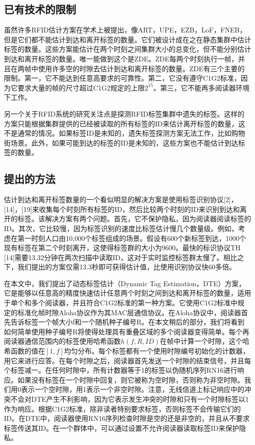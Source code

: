 \documentclass[UTF8]{ctexart}
\begin{document}
\subsection{已有技术的限制}
虽然许多RFID估计方案在学术上被提出，像ART，UPE，EZB，LoF，FNEB，但是它们都不能估计到达和离开标签的数量。它们被设计成在之在静态集群中估计标签的数量。这些方案能估计在两个时刻之间集群大小的总变化，但不能分别估计到达和离开标签的数量。唯一能做到这个是ZDE。ZDE每两个时刻执行一帧，并且在两帧中使用许多空的时隙去估计到达和离开标签的数量。ZDE有三个主要的限制。第一，它不能达到任意高要求的可靠性。第二，它没有遵守C1G2标准，因为它要求大量的帧的尺寸超过C1G2规定的上限$2^{15}$。第三，它不能再多阅读器环境下工作。

另一个关于RFID系统的研究关注点是探测RFID标签集群中遗失的标签。这样的方案只能根据集群提供的已经被读取的所有标签的ID来估计离开标签的数量，这不是通常的情况。如果标签ID是未知的，遗失标签探测方案无法工作，比如购物街场景。此外，如果可能到达的标签的ID是未知的，这些方案也不能估计到达标签的数量。

\subsection{提出的方法}
估计到达和离开标签数量的一个看似明显的解决方案是使用标签识别协议[2]，[14]，[19]来收集每个时刻所有标签的ID，然后比较两个时刻的ID来识别到达和离开的标签。该解决方案有两个问题。首先，它不保护隐私，因为阅读器阅读标签的ID。其次，它比较慢，因为标签识别的速度比标签估计慢几个数量级。例如，考虑在第一时刻人口由10,000个标签组成的场景。假设有600个新标签到达，1000个现有标签在第二个时刻离开，这使得标签群的大小为9600。最快的标识协议TH [14]需要13.32分钟在两次扫描中读取ID，这对于实时监控标签群太慢了。相比之下，我们提出的方案仅需13.3秒即可获得估计值，比使用识别协议快60多倍。

在本文中，我们提出了动态标签估计（Dynamic Tag Estimation，DTE）方案，它是能够以任意高的精度快速估计任意两个时刻之间到达和离开标签的数量，适用于单个和多个阅读器，并且符合C1G2标准的第一种方案。它使用C1G2标准中规定的标准化帧时隙Aloha协议作为其MAC层通信协议。在Aloha协议中，阅读器首先告诉标签一个帧大小f和一个随机种子编号R。在本文稍后的部分，我们将看到如何简单使用种子编号R将使得处理具有重叠区域的多个阅读器变得简单。每个再阅读器通信范围内的标签使用哈希函数$h(f, R, ID)$在帧中计算一个时隙，这个哈希函数的值在$[1, f]$均匀分布。每个标签都有一个使用时隙编号初始化的计数器，用它来进行应答。在每个时隙之后，阅读器首先发送一个时隙的结束信号，并且每个标签减一。在任何时隙中，所有计数器等于1的标签以伪随机序列RN16进行响应。如果没有标签在一个时隙中回复，则它被称为空时隙，否则称为非空时隙。我们用0表示一个空时隙，用1表示一个非空时隙。注意，无线信道上标记响应中的冲突不会对DTE产生不利影响，因为它表示发生冲突的时隙和只有一个时隙标签以1作为响应。根据C1G2标准，除非读者特别要求标签，否则标签不会传输它们的ID。在DTE中，阅读器使用RN16序列检查时隙是空的还是非空的，并且从不要求标签传送其ID。在一个群体中，可以通过设置不允许阅读器读取标签ID来保护隐私。
\end{document}
